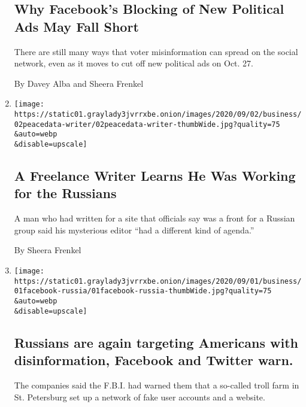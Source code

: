 \begin{enumerate}
  \hypertarget{why-facebooks-blocking-of-new-political-ads-may-fall-short}{%
  \subsection{Why Facebook's Blocking of New Political Ads May Fall
  Short}\label{why-facebooks-blocking-of-new-political-ads-may-fall-short}}

  There are still many ways that voter misinformation can spread on the
  social network, even as it moves to cut off new political ads on Oct.
  27.

  By Davey Alba and Sheera Frenkel
\item
  \href{/2020/09/02/technology/peacedata-writer-russian-misinformation.html}{}

  \texttt{[image: https://static01.graylady3jvrrxbe.onion/images/2020/09/02/business/02peacedata-writer/02peacedata-writer-thumbWide.jpg?quality=75\\\&auto=webp\\\&disable=upscale]}

  \hypertarget{a-freelance-writer-learns-he-was-working-for-the-russians}{%
  \subsection{A Freelance Writer Learns He Was Working for the
  Russians}\label{a-freelance-writer-learns-he-was-working-for-the-russians}}

  A man who had written for a site that officials say was a front for a
  Russian group said his mysterious editor ``had a different kind of
  agenda.''

  By Sheera Frenkel
\item
  \href{/2020/09/02/us/elections/russians-are-again-targeting-americans-with-disinformation-facebook-and-twitter-warn.html}{}

  \texttt{[image: https://static01.graylady3jvrrxbe.onion/images/2020/09/01/business/01facebook-russia/01facebook-russia-thumbWide.jpg?quality=75\\\&auto=webp\\\&disable=upscale]}

  \hypertarget{russians-are-again-targeting-americans-with-disinformation-facebook-and-twitter-warn}{%
  \subsection{Russians are again targeting Americans with
  disinformation, Facebook and Twitter
  warn.}\label{russians-are-again-targeting-americans-with-disinformation-facebook-and-twitter-warn}}

  The companies said the F.B.I. had warned them that a so-called troll
  farm in St. Petersburg set up a network of fake user accounts and a
  website.


\end{enumerate}
